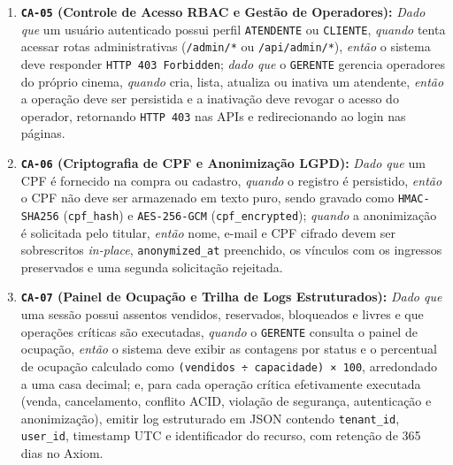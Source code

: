 \begin{enumerate}
\item \textbf{\texttt{CA-05} (Controle de Acesso RBAC e Gestão de Operadores):} \emph{Dado que} um usuário autenticado possui perfil \texttt{ATENDENTE} ou \texttt{CLIENTE}, \emph{quando} tenta acessar rotas administrativas (\texttt{/admin/*} ou \texttt{/\allowbreak\hspace{0pt plus 1pt}api/\allowbreak\hspace{0pt plus 1pt}admin/\allowbreak\hspace{0pt plus 1pt}*}), \emph{então} o sistema deve responder \texttt{HTTP \allowbreak\hspace{0pt plus 1pt}403 \allowbreak\hspace{0pt plus 1pt}Forbidden}; \emph{dado que} o \texttt{GERENTE} gerencia operadores do próprio cinema, \emph{quando} cria, lista, atualiza ou inativa um atendente, \emph{então} a operação deve ser persistida e a inativação deve revogar o acesso do operador, retornando \texttt{HTTP 403} nas APIs e redirecionando ao login nas páginas.
\item \textbf{\texttt{CA-06} (Criptografia de CPF e Anonimização LGPD):} \emph{Dado que} um CPF é fornecido na compra ou cadastro, \emph{quando} o registro é persistido, \emph{então} o CPF não deve ser armazenado em texto puro, sendo gravado como \texttt{HMAC-\allowbreak\hspace{0pt plus 1pt}SHA256} (\texttt{cpf\_hash}) e \texttt{AES-\allowbreak\hspace{0pt plus 1pt}256-\allowbreak\hspace{0pt plus 1pt}GCM} (\texttt{cpf\_\allowbreak\hspace{0pt plus 1pt}encrypted}); \emph{quando} a anonimização é solicitada pelo titular, \emph{então} nome, e-mail e CPF cifrado devem ser sobrescritos \emph{in-place}, \texttt{anonymized\_\allowbreak\hspace{0pt plus 1pt}at} preenchido, os vínculos com os ingressos preservados e uma segunda solicitação rejeitada.
\item \textbf{\texttt{CA-07} (Painel de Ocupação e Trilha de Logs Estruturados):} \emph{Dado que} uma sessão possui assentos vendidos, reservados, bloqueados e livres e que operações críticas são executadas, \emph{quando} o \texttt{GERENTE} consulta o painel de ocupação, \emph{então} o sistema deve exibir as contagens por status e o percentual de ocupação calculado como \texttt{(vendidos \allowbreak\hspace{0pt plus 1pt}÷ \allowbreak\hspace{0pt plus 1pt}capacidade)\allowbreak\hspace{0pt plus 1pt} \allowbreak\hspace{0pt plus 1pt}× \allowbreak\hspace{0pt plus 1pt}100}, arredondado a uma casa decimal; e, para cada operação crítica efetivamente executada (venda, cancelamento, conflito ACID, violação de segurança, autenticação e anonimização), emitir log estruturado em JSON contendo \texttt{tenant\_id}, \texttt{user\_id}, timestamp UTC e identificador do recurso, com retenção de 365 dias no Axiom.

\end{enumerate}
